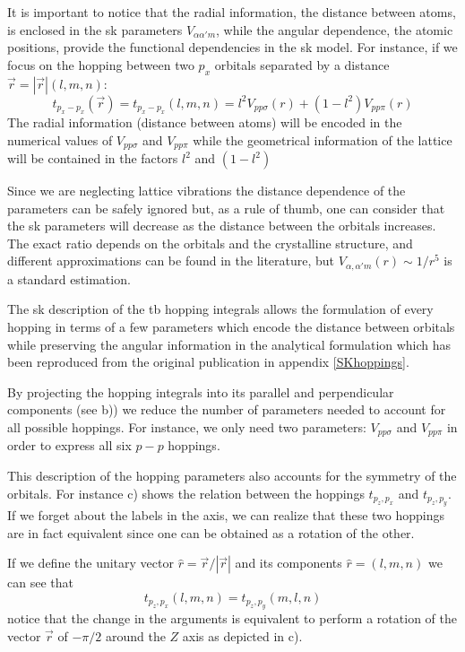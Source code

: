 It is important to notice that the radial information, \ie the distance between atoms, is enclosed in the \ac{sk} parameters $V_{\alpha\alpha'm}$, while the angular dependence, \ie the atomic positions, provide the functional dependencies in the \ac{sk} model. For instance, if we focus on the hopping between two $p_x$ orbitals\cite{Slater1954} separated by a distance $\vec{r}=|\vec{r}|(l,m,n)$:
\begin{equation}
  t_{p_x-p_x}(\vec{r})=  t_{p_x-p_x}(l,m,n) = l^2 V_{pp\sigma}(r) + (1-l^2) V_{pp\pi}(r)
\end{equation}
The radial information (distance between atoms) will be encoded in the numerical values of $V_{pp\sigma}$ and $V_{pp\pi}$ while the geometrical information of the lattice will be contained in the factors $l^2$ and $(1-l^2)$

Since we are neglecting lattice vibrations the distance dependence of the parameters can be safely ignored but, as a rule of thumb, one can consider that the \ac{sk} parameters will decrease as the distance between the orbitals increases.
The exact ratio depends on the orbitals and the crystalline structure, and different approximations can be found in the literature\cite{Harrison1930}, but $V_{\alpha,\alpha'm}(r)\sim1/r^5$ is a standard estimation.
\bigbreak


The \ac{sk} description of the \ac{tb} hopping integrals allows the formulation of every hopping in terms of a few parameters which encode the distance between orbitals while preserving the angular information in the analytical formulation which has been reproduced from the original publication in appendix \ref{SKhoppings}.
\medbreak


By projecting the hopping integrals into its parallel and perpendicular components (see b)) we reduce the number of parameters needed to account for all possible hoppings. For instance, we only need two parameters: $V_{pp\sigma}$ and $V_{pp\pi}$ in order to express all six $p-p$ hoppings.

This description of the hopping parameters also accounts for the symmetry of the orbitals. For instance c) shows the relation between the hoppings $t_{p_{z},p_{x}}$ and $t_{p_{z},p_{y}}$. If we forget about the labels in the axis, we can realize that these two hoppings are in fact equivalent since one can be obtained as a rotation of the other.

If we define the unitary vector $\hat{r} = \vec{r}/|\vec{r}|$ and its components $\hat{r}=(l,m,n)$ we can see that
\begin{equation}
  t_{p_{z},p_{x}} (l,m,n) = t_{p_{z},p_{y}}(m,l,n)
\end{equation}
notice that the change in the arguments is equivalent to perform a rotation of the vector $\vec{r}$ of $-\pi/2$ around the $Z$ axis as depicted in c).


